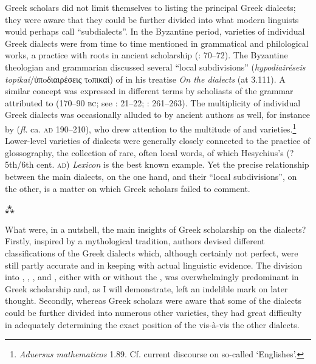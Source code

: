 Greek scholars did not limit themselves to listing the principal Greek dialects; they were aware that they could be further divided into what modern linguists would perhaps call “subdialects”. In the Byzantine period, varieties of individual Greek dialects were from time to time mentioned in grammatical and philological works, a practice with roots in ancient scholarship (\citealt{Hainsworth1967}: 70–72). The Byzantine theologian and grammarian  discussed several “local subdivisions” (\textit{hypodiairéseis topikaí}/ὑπoδιαιρέσεις τoπικαί) of  in his treatise \textit{On the dialects} (at 3.111). A similar concept was expressed in different terms by scholiasts of the grammar attributed to  (170–90 \textsc{bc}; see \citealt{Lambert2009}: 21–22; \citealt{VanRooy2016d}: 261–263). The multiplicity of individual Greek dialects was occasionally alluded to by ancient authors as well, for instance by  (\textit{fl.} ca. \textsc{ad} 190–210), who drew attention to the multitude of  and  varieties.\footnote{\textit{Aduersus mathematicos} 1.89. Cf. current discourse on so-called ‘Englishes’.} Lower-level varieties of dialects were generally closely connected to the practice of glossography, the collection of rare, often local words, of which Hesychius’s (?5th/6th cent. \textsc{ad}) \textit{Lexicon} is the best known example. Yet the precise relationship between the main dialects, on the one hand, and their “local subdivisions”, on the other, is a matter on which Greek scholars failed to comment.

\begin{center}
\Large⁂
\end{center}

\noindent What were, in a nutshell, the main insights of Greek scholarship on the dialects? Firstly, inspired by a mythological tradition, authors devised different classifications of the Greek dialects which, although certainly not perfect, were still partly accurate and in keeping with actual linguistic evidence. The division into , , , and , either with or without the , was overwhelmingly predominant in Greek scholarship and, as I will demonstrate, left an indelible mark on later thought. Secondly, whereas Greek scholars were aware that some of the dialects could be further divided into numerous other varieties, they had great difficulty in adequately determining the exact position of the  vis-à-vis the other dialects.

